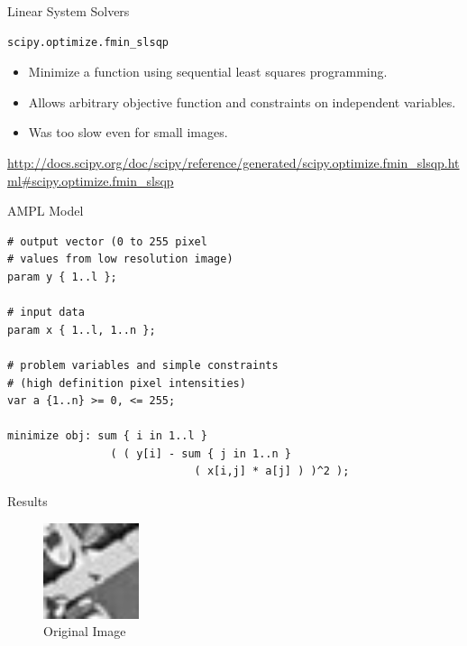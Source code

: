 \documentclass{beamer}
\begin{document}

\begin{frame}[fragile]{Linear System Solvers}

\begin{verbatim}
scipy.optimize.fmin_slsqp
\end{verbatim}

\begin{itemize}
\item Minimize a function using sequential least squares programming.

\vspace{0.3cm}

\item Allows arbitrary objective function and constraints on independent variables.

\vspace{0.3cm}

\item Was too slow even for small images.

\end{itemize}

\vspace{0.5cm}

\tiny{\url{http://docs.scipy.org/doc/scipy/reference/generated/scipy.optimize.fmin_slsqp.html#scipy.optimize.fmin_slsqp}}

\end{frame}


\begin{frame}[fragile]{AMPL Model}

\begin{verbatim}
# output vector (0 to 255 pixel
# values from low resolution image)
param y { 1..l };

# input data
param x { 1..l, 1..n };

# problem variables and simple constraints
# (high definition pixel intensities)
var a {1..n} >= 0, <= 255;

minimize obj: sum { i in 1..l }
                ( ( y[i] - sum { j in 1..n }
                             ( x[i,j] * a[j] ) )^2 );
\end{verbatim}

\end{frame}


\begin{frame}{Results}

\begin{figure}
\centering
\includegraphics[width=0.25\textwidth]{no-zoom.png}
\caption{Original Image}
\end{figure}

\end{frame}
\end{document}
